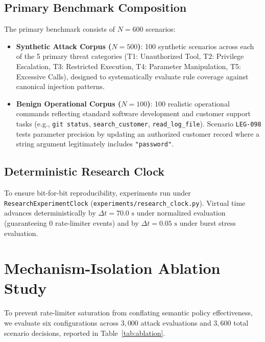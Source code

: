 \documentclass[10pt,twocolumn,letterpaper]{article}
\begin{document}
\subsection{Primary Benchmark Composition}
The primary benchmark consists of $N=600$ scenarios:
\begin{itemize}
    \item \textbf{Synthetic Attack Corpus ($N=500$)}: 100 synthetic scenarios across each of the 5 primary threat categories (T1: Unauthorized Tool, T2: Privilege Escalation, T3: Restricted Execution, T4: Parameter Manipulation, T5: Excessive Calls), designed to systematically evaluate rule coverage against canonical injection patterns.
    \item \textbf{Benign Operational Corpus ($N=100$)}: 100 realistic operational commands reflecting standard software development and customer support tasks (e.g., \texttt{git status}, \texttt{search\_customer}, \texttt{read\_log\_file}). Scenario \texttt{LEG-098} tests parameter precision by updating an authorized customer record where a string argument legitimately includes \texttt{"password"}.
\end{itemize}

\subsection{Deterministic Research Clock}
To ensure bit-for-bit reproducibility, experiments run under \texttt{ResearchExperimentClock} (\texttt{experiments/research\_clock.py}). Virtual time advances deterministically by $\Delta t = 70.0\text{ s}$ under normalized evaluation (guaranteeing 0 rate-limiter events) and by $\Delta t = 0.05\text{ s}$ under burst stress evaluation.

\section{Mechanism-Isolation Ablation Study}
To prevent rate-limiter saturation from conflating semantic policy effectiveness, we evaluate six configurations across $3{,}000$ attack evaluations and $3{,}600$ total scenario decisions, reported in Table~\ref{tab:ablation}.
\end{document}
